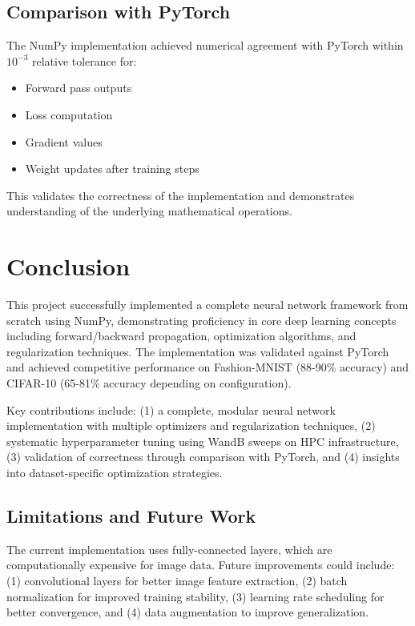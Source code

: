 \documentclass[11pt,a4paper]{article}
\begin{document}
\subsection{Comparison with PyTorch}

The NumPy implementation achieved numerical agreement with PyTorch within $10^{-3}$ relative tolerance for:
\begin{itemize}
\item Forward pass outputs
\item Loss computation
\item Gradient values
\item Weight updates after training steps
\end{itemize}

This validates the correctness of the implementation and demonstrates understanding of the underlying mathematical operations.

\section{Conclusion}

This project successfully implemented a complete neural network framework from scratch using NumPy, demonstrating proficiency in core deep learning concepts including forward/backward propagation, optimization algorithms, and regularization techniques. The implementation was validated against PyTorch and achieved competitive performance on Fashion-MNIST (88-90\% accuracy) and CIFAR-10 (65-81\% accuracy depending on configuration).

Key contributions include: (1) a complete, modular neural network implementation with multiple optimizers and regularization techniques, (2) systematic hyperparameter tuning using WandB sweeps on HPC infrastructure, (3) validation of correctness through comparison with PyTorch, and (4) insights into dataset-specific optimization strategies.

\subsection{Limitations and Future Work}

The current implementation uses fully-connected layers, which are computationally expensive for image data. Future improvements could include: (1) convolutional layers for better image feature extraction, (2) batch normalization for improved training stability, (3) learning rate scheduling for better convergence, and (4) data augmentation to improve generalization.
\end{document}
